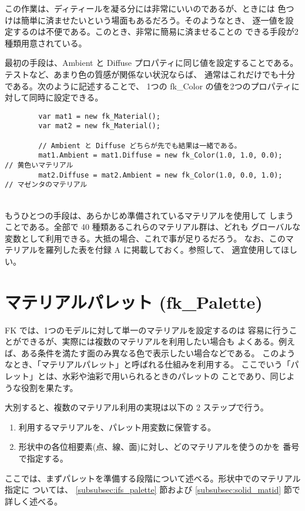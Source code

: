 この作業は、ディティールを凝る分には非常にいいのであるが、ときには
色つけは簡単に済ませたいという場面もあるだろう。そのようなとき、
逐一値を設定するのは不便である。このとき、非常に簡易に済ませることの
できる手段が2種類用意されている。

最初の手段は、Ambient と Diffuse プロパティに同じ値を設定することである。
テストなど、あまり色の質感が関係ない状況ならば、
通常はこれだけでも十分である。次のように記述することで、
1つの fk\_Color の値を2つのプロパティに対して同時に設定できる。
\\
\begin{screen}
\begin{verbatim}
        var mat1 = new fk_Material();
        var mat2 = new fk_Material();

        // Ambient と Diffuse どちらが先でも結果は一緒である。
        mat1.Ambient = mat1.Diffuse = new fk_Color(1.0, 1.0, 0.0);    // 黄色いマテリアル
        mat2.Diffuse = mat2.Ambient = new fk_Color(1.0, 0.0, 1.0);    // マゼンタのマテリアル
\end{verbatim}
\end{screen}
\\
もうひとつの手段は、あらかじめ準備されているマテリアルを使用して
しまうことである。全部で 40 種類あるこれらのマテリアル群は、どれも
グローバルな変数として利用できる。大抵の場合、これで事が足りるだろう。
なお、このマテリアルを羅列した表を付録 A に掲載しておく。参照して、
適宜使用してほしい。
\section{マテリアルパレット (fk\_Palette)} \label{sec:mat_palette}
FK では、1つのモデルに対して単一のマテリアルを設定するのは
容易に行うことができるが、実際には複数のマテリアルを利用したい場合も
よくある。例えば、ある条件を満たす面のみ異なる色で表示したい場合などである。
このようなとき、「マテリアルパレット」と呼ばれる仕組みを利用する。
ここでいう「パレット」とは、水彩や油彩で用いられるときのパレットの
ことであり、同じような役割を果たす。

大別すると、複数のマテリアル利用の実現は以下の 2 ステップで行う。
\begin{enumerate}
 \item 利用するマテリアルを、パレット用変数に保管する。
 \item 形状中の各位相要素(点、線、面)に対し、どのマテリアルを使うのかを
	番号で指定する。
\end{enumerate}
ここでは、まずパレットを準備する段階について述べる。形状中でのマテリアル指定に
ついては、
\ref{subsubsec:ifs_palette} 節および
\ref{subsubsec:solid_matid} 節で詳しく述べる。

